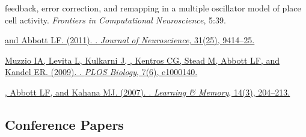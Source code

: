 \begin{description}
{{        feedback, error correction, and remapping in a multiple oscillator model of
      place cell activity}. \emph{Frontiers in Computational Neuroscience}, 5:39.
    }
  \item \href{https://dx.doi.org/10.1523/JNEUROSCI.1433-11.2011}
    { and Abbott LF. (2011). . \emph{Journal of Neuroscience}, 31(25), 9414--25.
    }
  \item \href{https://dx.doi.org/10.1371/journal.pbio.1000140}
    {Muzzio IA, Levita L, Kulkarni J, , Kentros CG, Stead
      M, Abbott LF, and Kandel ER. (2009). . \emph{PLOS Biology}, 7(6), e1000140.
    }
  \item \href{https://dx.doi.org/10.1101/lm.363207}
    {, Abbott LF, and Kahana MJ. (2007).
      . \emph{Learning \& Memory}, 14(3), 204--213.
    }
\end{description}

\subsection*{Conference Papers}
\label{sec:confpapers}

